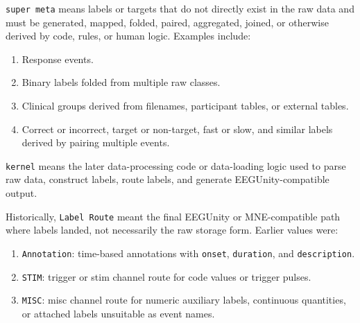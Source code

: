 \begin{tcolorbox}
\smallskip{}\par\smallskip

\noindent \texttt{super meta} means labels or targets that do not directly exist in the raw data and must be generated, mapped, folded, paired, aggregated, joined, or otherwise derived by code, rules, or human logic. Examples include:\par\smallskip

\begin{enumerate}[leftmargin=1.5em,noitemsep,topsep=2pt]
\item Response events.
\item Binary labels folded from multiple raw classes.
\item Clinical groups derived from filenames, participant tables, or external tables.
\item Correct or incorrect, target or non-target, fast or slow, and similar labels derived by pairing multiple events.
\end{enumerate}

\smallskip{}\par\smallskip

\noindent \texttt{kernel} means the later data-processing code or data-loading logic used to parse raw data, construct labels, route labels, and generate EEGUnity-compatible output.\par\smallskip

\smallskip{}\par\smallskip

\noindent Historically, \texttt{Label Route} meant the final EEGUnity or MNE-compatible path where labels landed, not necessarily the raw storage form. Earlier values were:\par\smallskip

\begin{enumerate}[leftmargin=1.5em,noitemsep,topsep=2pt]
\item \texttt{Annotation}: time-based annotations with \texttt{onset}, \texttt{duration}, and \texttt{description}.
\item \texttt{STIM}: trigger or stim channel route for code values or trigger pulses.
\item \texttt{MISC}: misc channel route for numeric auxiliary labels, continuous quantities, or attached labels unsuitable as event names.
\end{enumerate}


\end{tcolorbox}

